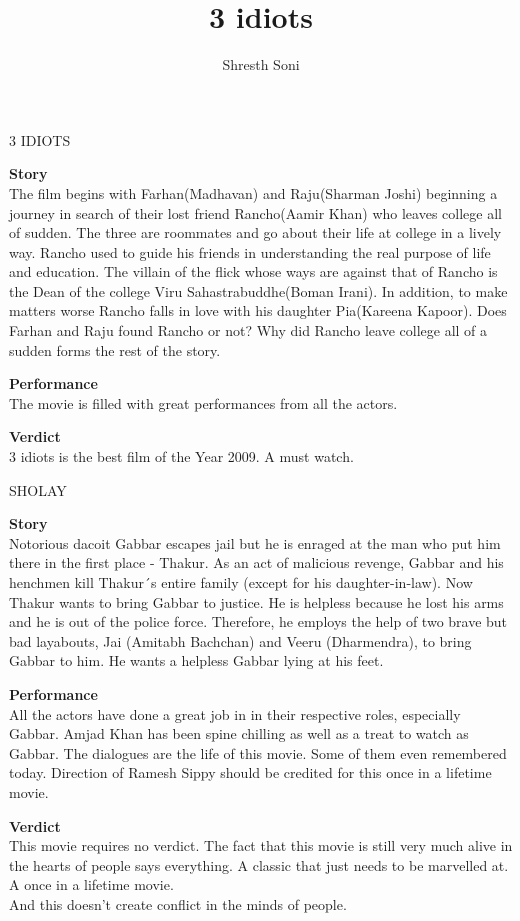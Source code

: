 \documentclass{article}
\title{ 3 idiots}
\author{Shresth Soni}
\begin{document}
\begin{center}
\textmd {\huge 3 IDIOTS}
\end{center}

\begin{flushleft}
\textbf{Story}\\
The film begins with Farhan(Madhavan) and Raju(Sharman Joshi) beginning a journey in search of their lost friend Rancho(Aamir Khan) who leaves college all of sudden. The three are roommates and go about their life at college in a lively way. Rancho used to guide his friends in understanding the real purpose of life and education. The villain of the flick whose ways are against that of Rancho is the Dean of the college Viru Sahastrabuddhe(Boman Irani). In addition, to make matters worse Rancho falls in love with his daughter Pia(Kareena Kapoor). Does Farhan and Raju found Rancho or not? Why did Rancho leave college all of a sudden forms the rest of the story.\\
\vspace{3mm}

\textbf{Performance}\\
The movie is filled with great performances from all the actors.
\vspace{3mm}

\textbf{Verdict}\\
3 idiots is the best film of the Year 2009. A must watch.
\vspace{3mm}

\begin{center}
\textmd {\huge SHOLAY}
\end{center}
\textbf{Story}\\
Notorious dacoit Gabbar escapes jail but he is enraged at the man who put him there in the first place - Thakur. As an act of malicious revenge, Gabbar and his henchmen kill Thakur´s entire family (except for his daughter-in-law). Now Thakur wants to bring Gabbar to justice. He is helpless because he lost his arms and he is out of the police force. Therefore, he employs the help of two brave but bad layabouts, Jai (Amitabh Bachchan) and Veeru (Dharmendra), to bring Gabbar to him. He wants a helpless Gabbar lying at his feet.\\
\vspace{3mm}

\textbf{Performance}\\
All the actors have done a great job in in their respective roles, especially Gabbar. Amjad Khan has been spine chilling as well as a treat to watch as Gabbar. The dialogues are the life of this movie. Some of them even remembered today. Direction of Ramesh Sippy should be credited for this once in a lifetime movie.\\ 
\vspace{3mm}

\textbf{Verdict}\\
This movie requires no verdict. The fact that this movie is still very much alive in the hearts of people says everything. A classic that just needs to be marvelled at. A once in a lifetime movie.\\
And this doesn't create conflict in the minds of people.\\
\end{flushleft}
\end{document}
